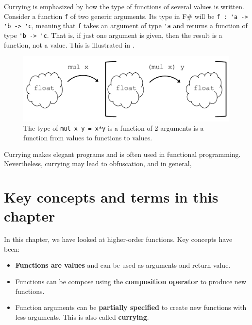 \documentclass[fsharpNotes.tex]{subfiles}
\begin{document}
Currying is emphasized by how the type of functions of several values is written. Consider a function \lstinline{f} of two generic arguments. Its type in F\# will be \lstinline{f : 'a -> 'b -> 'c}, meaning that \lstinline{f} takes an argument of type \lstinline{'a} and returns a function of type \lstinline{'b -> 'c}. That is, if just one argument is given, then the result is a function, not a value. This is illustrated in .
\begin{figure}
  \centering
  \includegraphics[width=0.6\linewidth]{composition}
  \caption{The type of \lstinline{mul x y = x*y} is a function of 2 arguments is a function from values to functions to values.}
  \label{fig:arrowNotation}
\end{figure}

Currying makes elegant programs and is often used in functional programming. Nevertheless, currying may lead to obfuscation, and in general, 

\section{Key concepts and terms in this chapter}
In this chapter, we have looked at higher-order functions. Key concepts have been:
\begin{itemize}
\item \textbf{Functions are values} and can be used as arguments and return value.
\item Functions can be compose using the \textbf{composition operator} to produce new functions.
\item Function arguments can be \textbf{partially specified} to create new functions with less arguments. This is also called \textbf{currying}.
\end{itemize}
\end{document}
